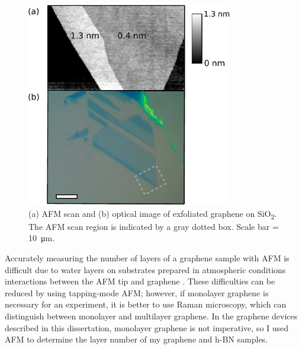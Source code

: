 \documentclass[double,12pt,1in]{beavtex}
\begin{document}
\begin{figure}
    \centering
    \includegraphics[width = 9cm]{graphene layer comparison.pdf}
    \caption{(a) AFM scan and (b) optical image of exfoliated graphene on SiO\textsubscript{2}. The AFM scan region is indicated by a gray dotted box. Scale bar = \SI{10}{\micro\meter}.}
    \label{fig:graphenelayer}
\end{figure}
Accurately measuring the number of layers of a graphene sample with AFM is difficult due to water layers on substrates prepared in atmospheric conditions interactions between the AFM tip and graphene \cite{shearer_accurate_2016}. These difficulties can be reduced by using tapping-mode AFM; however, if monolayer graphene is necessary for an experiment, it is better to use Raman microscopy, which can distinguish between monolayer and multilayer graphene. In the graphene devices described in this dissertation, monolayer graphene is not imperative, so I used AFM to determine the layer number of my graphene and h-BN samples.
\end{document}

